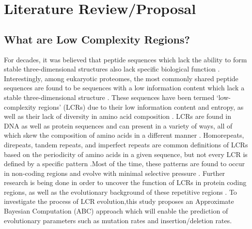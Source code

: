 \documentclass[10pt]{article}
\begin{document}
                        
\newpage
%

\section{Literature Review/Proposal}
\subsection{What are Low Complexity Regions?}
For decades, it was believed that peptide sequences which lack the ability to form stable three-dimensional structures also lack specific biological function \citep{haerty2010low}. Interestingly, among eukaryotic proteomes, the most commonly
shared peptide sequences are found to be sequences with a low information content which lack a stable three-dimensional
structure \citep{marcotte1999census, bannen2007effect, haerty2010low}. These sequences have been termed ‘low-
complexity regions’ (LCRs) due to their low information content and entropy, as well as their lack of diversity in amino acid
composition \citep{wootton1993statistics, coletta2010low}. LCRs are found in DNA as well as protein sequences and can
present in a variety of ways, all of which skew the composition of amino acids in a different manner \citep{wootton1993statistics, mier2020disentangling}. Homorepeats, direpeats, tandem repeats, and imperfect repeats are common definitions of LCRs based
on the periodicity of amino acids in a given sequence, but not every LCR is defined by a specific pattern \citep{mier2020disentangling}.Most of the time, these patterns are found to occur in non-coding regions and evolve with minimal selective pressure \citep{kruglyak2000distribution}. Further research is being done in order to uncover the function of LCRs in protein coding regions, as well as the evolutionary background of these repetitive regions \citep{huntley2006selection}. To investigate the process of LCR evolution,this study proposes an Approximate Bayesian Computation (ABC) approach which will enable the prediction of evolutionary
parameters such as mutation rates and insertion/deletion rates.
\end{document}
